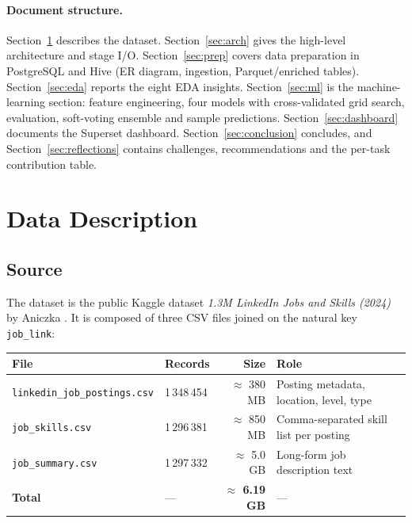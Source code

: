 \documentclass[11pt,a4paper]{article}
\begin{document}
\paragraph{Document structure.}
Section~\ref{sec:data} describes the dataset.  Section~\ref{sec:arch}
gives the high-level architecture and stage I/O.
Section~\ref{sec:prep} covers data preparation in PostgreSQL and Hive
(ER diagram, ingestion, Parquet/enriched tables).
Section~\ref{sec:eda} reports the eight EDA insights.
Section~\ref{sec:ml} is the machine-learning section: feature
engineering, four models with cross-validated grid search, evaluation,
soft-voting ensemble and sample predictions.
Section~\ref{sec:dashboard} documents the Superset dashboard.
Section~\ref{sec:conclusion} concludes, and
Section~\ref{sec:reflections} contains challenges, recommendations and
the per-task contribution table.

\section{Data Description}
\label{sec:data}

\subsection{Source}
The dataset is the public Kaggle dataset
\textit{1.3M LinkedIn Jobs and Skills (2024)} by Aniczka
\cite{kaggle-linkedin-2024}.  It is composed of three CSV files joined
on the natural key \texttt{job\_link}:

\begin{center}
\begin{tabularx}{\linewidth}{l l r X}
\toprule
\textbf{File} & \textbf{Records} & \textbf{Size} & \textbf{Role} \\
\midrule
\texttt{linkedin\_job\_postings.csv} & 1\,348\,454 & $\approx$ 380 MB & Posting metadata, location, level, type \\
\texttt{job\_skills.csv}             & 1\,296\,381 & $\approx$ 850 MB & Comma-separated skill list per posting \\
\texttt{job\_summary.csv}            & 1\,297\,332 & $\approx$ 5.0 GB & Long-form job description text \\
\midrule
\textbf{Total}                       & --- & \textbf{$\approx$ 6.19 GB} & --- \\
\bottomrule
\end{tabularx}
\end{center}
\end{document}
